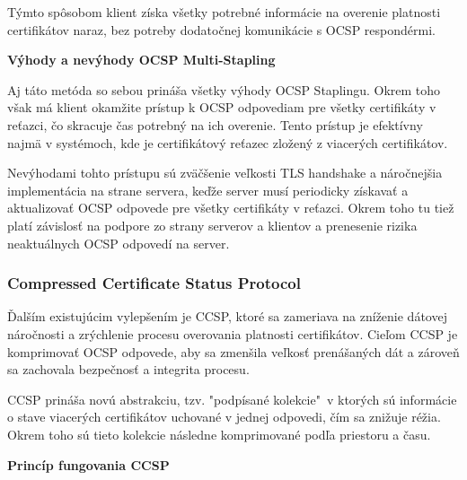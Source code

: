 \documentclass[12pt, twoside]{book}
\newcommand{\subsubsubsection}[1]{%
  \vspace{0.2em}  
  \textbf{#1} \\[0.2em]
  \hspace*{\parindent}
}
\begin{document}
Týmto spôsobom klient získa všetky potrebné informácie na overenie platnosti certifikátov naraz, bez potreby dodatočnej komunikácie s OCSP respondérmi.

\subsubsubsection{Výhody a nevýhody OCSP Multi-Stapling}
Aj táto metóda so sebou prináša všetky výhody OCSP Staplingu. Okrem toho však má klient okamžite prístup k OCSP odpovediam pre všetky certifikáty v reťazci, čo skracuje čas potrebný na ich overenie. Tento prístup je efektívny najmä v systémoch, kde je certifikátový reťazec zložený z viacerých  certifikátov.

Nevýhodami tohto prístupu sú zväčšenie veľkosti TLS handshake a náročnejšia implementácia na strane servera, keďže server musí periodicky získavať a aktualizovať OCSP odpovede pre všetky certifikáty v reťazci. Okrem toho tu tiež platí závislosť na podpore zo strany serverov a klientov a prenesenie rizika neaktuálnych OCSP odpovedí na server.

\subsubsection{Compressed Certificate Status Protocol}
Ďalším existujúcim vylepšením je CCSP, ktoré sa zameriava na zníženie dátovej náročnosti a zrýchlenie procesu overovania platnosti certifikátov. Cieľom CCSP je komprimovať OCSP odpovede, aby sa zmenšila veľkosť prenášaných dát a zároveň sa zachovala bezpečnosť a integrita procesu.

CCSP prináša novú abstrakciu, tzv. "podpísané kolekcie"\, v ktorých sú informácie o stave viacerých certifikátov uchované v jednej odpovedi, čím sa znižuje réžia. Okrem toho sú tieto kolekcie následne komprimované podľa priestoru a času.\cite{ccsp}

\subsubsubsection{Princíp fungovania CCSP}
\end{document}
